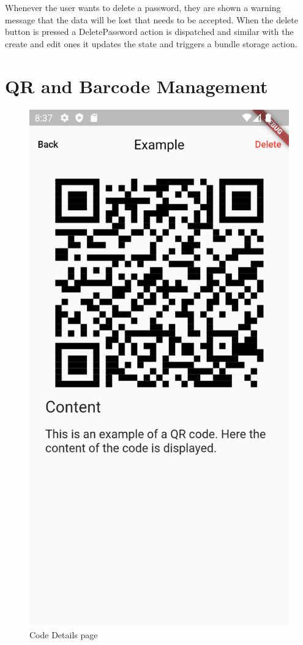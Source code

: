 \documentclass[a4paper,12pt]{report}
\begin{document}
Whenever the user wants to delete a password, they are shown a warning message
that the data will be lost that needs to be accepted. When the delete button is
pressed a DeletePassword action is dispatched and similar with the create and
edit ones it updates the state and triggers a bundle storage action.

\section{QR and Barcode Management}

\begin{figure}[H]
    \centering
    \includegraphics[scale=0.45]{images/app/view_qr.png}
    \caption{Code Details page}\label{fig:code_details}
\end{figure}
\end{document}

